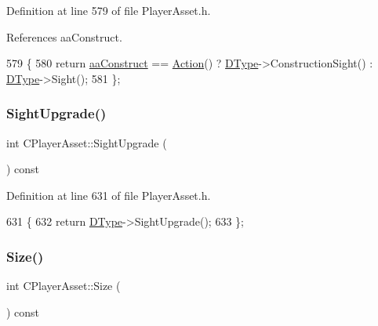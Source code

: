 Definition at line 579 of file Player\+Asset.\+h.



References aa\+Construct.


\begin{DoxyCode}
579                          \{
580             \textcolor{keywordflow}{return} \hyperlink{GameDataTypes_8h_ab47668e651a3032cfb9c40ea2d60d670a7ef6b863f66dd7dcc95a199cd758ae1d}{aaConstruct} == \hyperlink{classCPlayerAsset_ad9a1fdc2ca221636ccab01891ea1f951}{Action}() ? \hyperlink{classCPlayerAsset_a5d61f73471e1e6f0a6ab15f2ffa7b359}{DType}->ConstructionSight() : 
      \hyperlink{classCPlayerAsset_a5d61f73471e1e6f0a6ab15f2ffa7b359}{DType}->Sight();  
581         \};
\end{DoxyCode}
\hypertarget{classCPlayerAsset_aaa297dbacfa25d61ce2b3498ed139c5b}{}\label{classCPlayerAsset_aaa297dbacfa25d61ce2b3498ed139c5b} 
\subsubsection{\texorpdfstring{Sight\+Upgrade()}{SightUpgrade()}}
{\footnotesize\ttfamily int C\+Player\+Asset\+::\+Sight\+Upgrade (\begin{DoxyParamCaption}{ }\end{DoxyParamCaption}) const\hspace{0.3cm}{\ttfamily [inline]}}



Definition at line 631 of file Player\+Asset.\+h.


\begin{DoxyCode}
631                                 \{
632             \textcolor{keywordflow}{return} \hyperlink{classCPlayerAsset_a5d61f73471e1e6f0a6ab15f2ffa7b359}{DType}->SightUpgrade();
633         \};
\end{DoxyCode}
\hypertarget{classCPlayerAsset_a85a9e2ce62f557e93219676117159fec}{}\label{classCPlayerAsset_a85a9e2ce62f557e93219676117159fec} 
\subsubsection{\texorpdfstring{Size()}{Size()}}
{\footnotesize\ttfamily int C\+Player\+Asset\+::\+Size (\begin{DoxyParamCaption}{ }\end{DoxyParamCaption}) const\hspace{0.3cm}{\ttfamily [inline]}}



